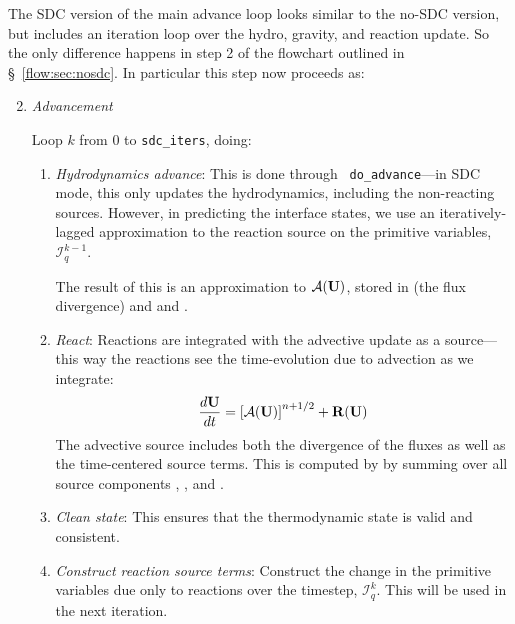 The SDC version of the main advance loop looks similar to the no-SDC
version, but includes an iteration loop over the hydro, gravity, and
reaction update.  So the only difference happens in step 2 of the
flowchart outlined in \S~\ref{flow:sec:nosdc}.  In particular this
step now proceeds as:

\begin{enumerate}
\setcounter{enumi}{1}

\item {\em Advancement}

  Loop $k$ from 0 to {\tt sdc\_iters}, doing:

  \begin{enumerate}
    \item {\em Hydrodynamics advance}: This is done through {\tt
      do\_advance}---in SDC mode, this only updates the hydrodynamics,
      including the non-reacting sources.  However, in predicting the
      interface states, we use an iteratively-lagged approximation to the 
      reaction source on the primitive variables, $\mathcal{I}_q^{k-1}$.  

      The result of this is an approximation to $\mathcal{A}({\bf U})$,
      stored in  (the flux divergence)
      and  and .

    \item {\em React}: Reactions are integrated with the advective
      update as a source---this way the reactions see the
      time-evolution due to advection as we integrate:
      \begin{equation}
        \frac{d{\bf U}}{dt} = \left [ \mathcal{A}({\bf U}) \right ]^{n+1/2} + {\bf R}({\bf U})
      \end{equation}
     The advective source includes both the divergence of the fluxes
      as well as the time-centered source terms.  This is computed by
       by summing over all source components
      , , and
      .  

    \item {\em Clean state}: This ensures that the thermodynamic state is
      valid and consistent.

    \item {\em Construct reaction source terms}: Construct the change
      in the primitive variables due only to reactions over the
      timestep, $\mathcal{I}_q^{k}$.  This will be used in the next
      iteration.
  \end{enumerate}


\end{enumerate}


